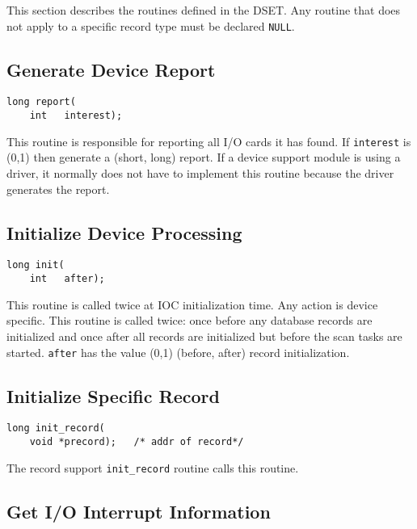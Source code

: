 This section describes the routines defined in the DSET. Any routine that does not apply to a specific record type must be 
declared \verb|NULL|.

\subsection{Generate Device Report}

\begin{verbatim}
long report(
    int   interest);
\end{verbatim}

This routine is responsible for reporting all I/O cards it has found. If \verb|interest| is (0,1) then generate a (short, long) 
report. If a device support module is using a driver, it normally does not have to implement this routine because the driver 
generates the report.

\subsection{Initialize Device Processing}

\begin{verbatim}
long init(
    int   after);
\end{verbatim}

This routine is called twice at IOC initialization time. Any action is device specific. This routine is called twice: once 
before any database records are initialized and once after all records are initialized but before the scan tasks are started. 
\verb|after| has the value (0,1) (before, after) record initialization.

\subsection{Initialize Specific Record}

\begin{verbatim}
long init_record(
    void *precord);   /* addr of record*/
\end{verbatim}

The record support \verb|init_record| routine calls this routine.

\subsection{Get I/O Interrupt Information}

